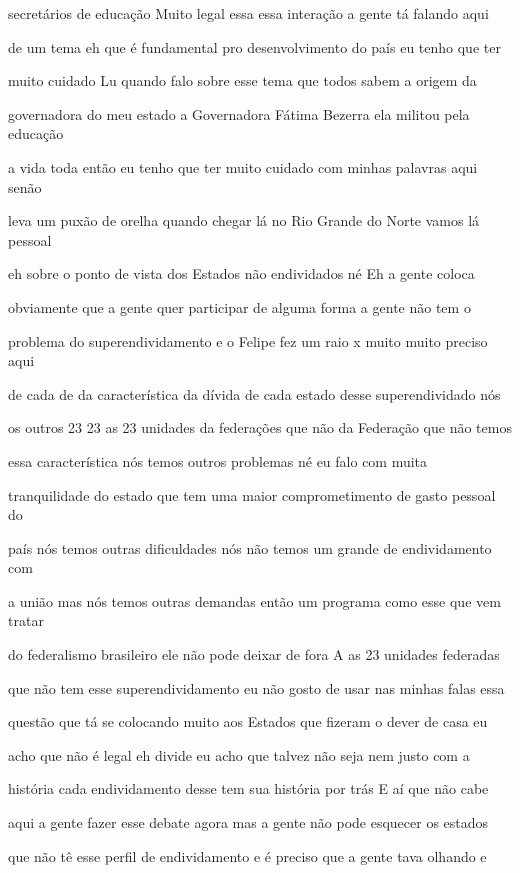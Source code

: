 \documentclass[a4paper,12pt]{article}
\begin{document}
secretários de educação Muito legal essa essa interação a gente tá falando aqui

de um tema eh que é fundamental pro desenvolvimento do país eu tenho que ter

muito cuidado Lu quando falo sobre esse tema que todos sabem a origem da

governadora do meu estado a Governadora Fátima Bezerra ela militou pela educação

a vida toda então eu tenho que ter muito cuidado com minhas palavras aqui senão

leva um puxão de orelha quando chegar lá no Rio Grande do Norte vamos lá pessoal

eh sobre o ponto de vista dos Estados não endividados né Eh a gente coloca

obviamente que a gente quer participar de alguma forma a gente não tem o

problema do superendividamento e o Felipe fez um raio x muito muito preciso aqui

de cada de da característica da dívida de cada estado desse superendividado nós

os outros 23 23 as 23 unidades da federações que não da Federação que não temos

essa característica nós temos outros problemas né eu falo com muita

tranquilidade do estado que tem uma maior comprometimento de gasto pessoal do

país nós temos outras dificuldades nós não temos um grande de endividamento com

a união mas nós temos outras demandas então um programa como esse que vem tratar

do federalismo brasileiro ele não pode deixar de fora A as 23 unidades federadas

que não tem esse superendividamento eu não gosto de usar nas minhas falas essa

questão que tá se colocando muito aos Estados que fizeram o dever de casa eu

acho que não é legal eh divide eu acho que talvez não seja nem justo com a

história cada endividamento desse tem sua história por trás E aí que não cabe

aqui a gente fazer esse debate agora mas a gente não pode esquecer os estados

que não tê esse perfil de endividamento e é preciso que a gente tava olhando e
\end{document}
